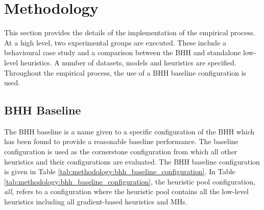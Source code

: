 \section{Methodology}
\label{sec:methodology}

This section provides the details of the implementation of the empirical process. At a high level, two experimental groups are executed. These include a behavioural case study and a comparison between the \acs{BHH} and standalone low-level heuristics. A number of datasets, models and heuristics are specified. Throughout the empirical process, the use of a \acs{BHH} baseline configuration is used.

\subsection{BHH Baseline}\label{sec:methodology:baseline_bhh}

The \acs{BHH} baseline is a name given to a specific configuration of the \acs{BHH} which has been found to provide a reasonable baseline performance. The baseline configuration is used as the cornerstone configuration from which all other heuristics and their configurations are evaluated. The \acs{BHH} baseline configuration is given in Table \ref{tab:methodology:bhh_baseline_configuration}. In Table \ref{tab:methodology:bhh_baseline_configuration}, the heuristic pool configuration, \textit{all}, refers to a configuration where the heuristic pool contains all the low-level heuristics including all gradient-based heuristics and \acp{MH}.

